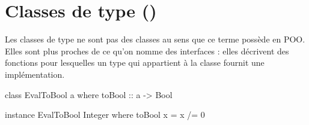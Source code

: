 \section{ Classes de type ()}
\label{typeclasses}

Les classes de type ne sont pas des classes au sens que ce terme possède en POO.
Elles sont plus proches de ce qu'on nomme des interfaces : elles décrivent des fonctions
pour lesquelles un type qui appartient à la classe fournit une implémentation.

\begin{haskellcode}
class EvalToBool a where
    toBool :: a -> Bool

instance EvalToBool Integer where
    toBool x = x /= 0
\end{haskellcode}
